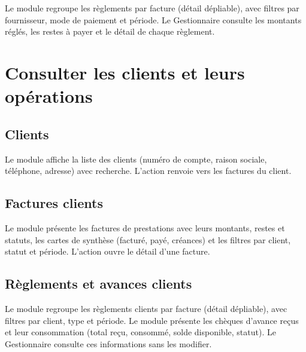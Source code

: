 Le module  regroupe les règlements par facture (détail dépliable), avec filtres par fournisseur, mode de paiement et période. Le Gestionnaire consulte les montants réglés, les restes à payer et le détail de chaque règlement.


\section{Consulter les clients et leurs opérations}

\subsection{Clients}

Le module  affiche la liste des clients (numéro de compte, raison sociale, téléphone, adresse) avec recherche. L'action  renvoie vers les factures du client.


\subsection{Factures clients}

Le module  présente les factures de prestations avec leurs montants, restes et statuts, les cartes de synthèse (facturé, payé, créances) et les filtres par client, statut et période. L'action  ouvre le détail d'une facture.


\subsection{Règlements et avances clients}

Le module  regroupe les règlements clients par facture (détail dépliable), avec filtres par client, type et période. Le module  présente les chèques d'avance reçus et leur consommation (total reçu, consommé, solde disponible, statut). Le Gestionnaire consulte ces informations sans les modifier.

